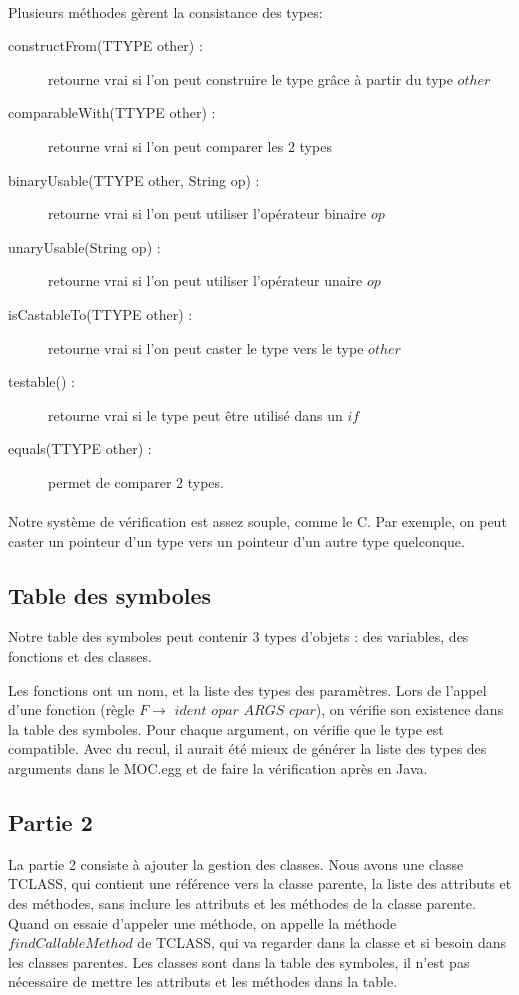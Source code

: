 \documentclass{scrartcl}
\begin{document}
\paragraph{}
Plusieurs méthodes gèrent la consistance des types:
\begin{description}
    \item[constructFrom(TTYPE other) :] retourne vrai si l'on peut construire le type grâce à partir du type $other$
    \item[comparableWith(TTYPE other) :] retourne vrai si l'on peut comparer les 2 types
    \item[binaryUsable(TTYPE other, String op) :] retourne vrai si l'on peut utiliser l'opérateur binaire $op$
    \item[unaryUsable(String op) :] retourne vrai si l'on peut utiliser l'opérateur unaire $op$
    \item[isCastableTo(TTYPE other) :] retourne vrai si l'on peut caster le type vers le type $other$
    \item[testable() :] retourne vrai si le type peut être utilisé dans un $if$
    \item[equals(TTYPE other) :] permet de comparer 2 types.
\end{description}

\paragraph{}
Notre système de vérification est assez souple, comme le C. Par exemple, on peut caster un pointeur d'un type vers
un pointeur d'un autre type quelconque.

\subsection{Table des symboles}
Notre table des symboles peut contenir 3 types d'objets : des variables, des fonctions et des classes.

Les fonctions ont un nom, et la liste des types des paramètres.
Lors de l'appel d'une fonction (règle $F \rightarrow $ $ident$ $opar$ $ARGS$ $cpar$), on vérifie son existence dans la table des symboles.
Pour chaque argument, on vérifie que le type est compatible.
Avec du recul, il aurait été mieux de générer la liste des types des arguments dans le MOC.egg
et de faire la vérification après en Java.

\subsection{Partie 2}
La partie 2 consiste à ajouter la gestion des classes.
Nous avons une classe TCLASS, qui contient une référence vers la classe parente,
la liste des attributs et des méthodes, sans inclure les attributs et les méthodes
de la classe parente. Quand on essaie d'appeler une méthode, on appelle la méthode
$findCallableMethod$ de TCLASS, qui va regarder dans la classe et si besoin dans les
classes parentes. Les classes sont dans la table des symboles, il n'est pas nécessaire
de mettre les attributs et les méthodes dans la table.
\end{document}
